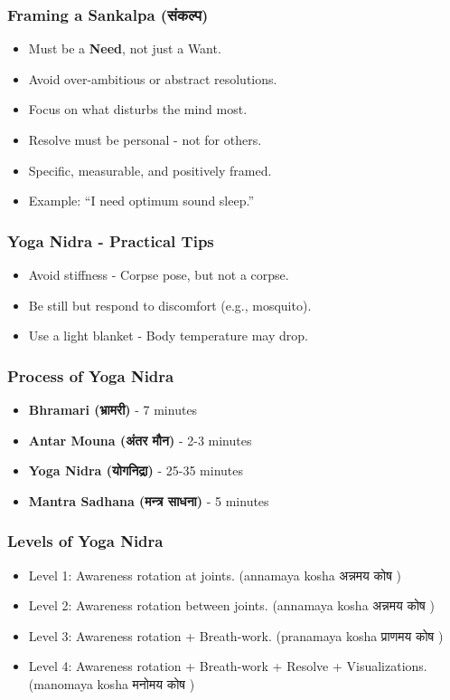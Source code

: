 \begin{frame}[fragile]\frametitle{Framing a Sankalpa (संकल्प)}
      \begin{itemize}
        \item Must be a \textbf{Need}, not just a Want.
        \item Avoid over-ambitious or abstract resolutions.
        \item Focus on what disturbs the mind most.
        \item Resolve must be personal - not for others.
        \item Specific, measurable, and positively framed.
        \item Example: “I need optimum sound sleep.”
      \end{itemize}
\end{frame}

\begin{frame}[fragile]\frametitle{Yoga Nidra - Practical Tips}
      \begin{itemize}
        \item Avoid stiffness - Corpse pose, but not a corpse.
        \item Be still but respond to discomfort (e.g., mosquito).
        \item Use a light blanket - Body temperature may drop.
      \end{itemize}
\end{frame}

\begin{frame}[fragile]\frametitle{Process of Yoga Nidra}
      \begin{itemize}
        \item \textbf{Bhramari (भ्रामरी)} - 7 minutes
        \item \textbf{Antar Mouna (अंतर मौन)} - 2-3 minutes
        \item \textbf{Yoga Nidra (योगनिद्रा)} - 25-35 minutes
        \item \textbf{Mantra Sadhana (मन्त्र साधना)} - 5 minutes
      \end{itemize}
\end{frame}

\begin{frame}[fragile]\frametitle{Levels of Yoga Nidra}
      \begin{itemize}
        \item Level 1: Awareness rotation at joints. (annamaya kosha अन्नमय कोष )
        \item Level 2: Awareness rotation between joints. (annamaya kosha अन्नमय कोष )
        \item Level 3: Awareness rotation + Breath-work. (pranamaya kosha प्राणमय कोष )
        \item Level 4: Awareness rotation + Breath-work + Resolve + Visualizations. (manomaya kosha मनोमय कोष )
      \end{itemize}
\end{frame}


